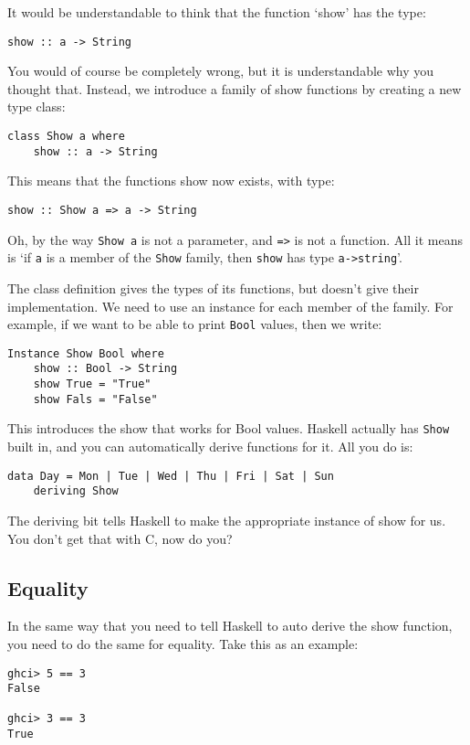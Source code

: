 \documentclass[11pt,a4paper,titlepage]{scrartcl}
\begin{document}
It would be understandable to think that the function `show' has the type:
\begin{lstlisting}
show :: a -> String
\end{lstlisting}

You would of course be completely wrong, but it is understandable why you
thought that. Instead, we introduce a family of show functions by creating
a new type class:
\begin{lstlisting}
class Show a where
    show :: a -> String
\end{lstlisting}

This means that the functions show now exists, with type:
\begin{lstlisting}
show :: Show a => a -> String
\end{lstlisting}

Oh, by the way \lstinline|Show a| is not a parameter, and \lstinline|=>| is not
a function. All it means is `if \lstinline|a| is a member of the
\lstinline|Show| family, then \lstinline|show| has type \lstinline|a->string|'.

The class definition gives the types of its functions, but doesn't give their
implementation. We need to use an instance for each member of the family. For
example, if we want to be able to print \lstinline|Bool| values, then we write:
\begin{lstlisting}
Instance Show Bool where
    show :: Bool -> String
    show True = "True"
    show Fals = "False"
\end{lstlisting}

This introduces the show that works for Bool values. Haskell actually has
\lstinline|Show| built in, and you can automatically derive functions for it.
All you do is:

\begin{lstlisting}
data Day = Mon | Tue | Wed | Thu | Fri | Sat | Sun
    deriving Show
\end{lstlisting}

The deriving bit tells Haskell to make the appropriate instance of show for us.
You don't get that with C, now do you?

\subsection{Equality}%
\label{sub:Equality}
In the same way that you need to tell Haskell to auto derive the show function,
you need to do the same for equality. Take this as an example:
\begin{lstlisting}
ghci> 5 == 3
False

ghci> 3 == 3
True
\end{lstlisting}
\end{document}
